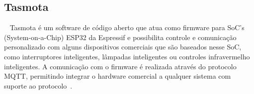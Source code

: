 \subsection{Tasmota}
~\label{sec:tasmota}
Tasmota é um software de código aberto que atua como firmware para SoC’s (System-on-a-Chip) ESP32 
da Espressif e possibilita controle e comunicação personalizado com alguns dispositivos comerciais que são 
baseados nesse SoC, como interruptores inteligentes, lâmpadas inteligentes ou controles infravermelho
inteligentes.
A comunicação com o firmware é realizada através do protocolo MQTT, permitindo integrar o hardware comercial
a qualquer sistema com suporte ao protocolo~\cite{tasmota-1}.



